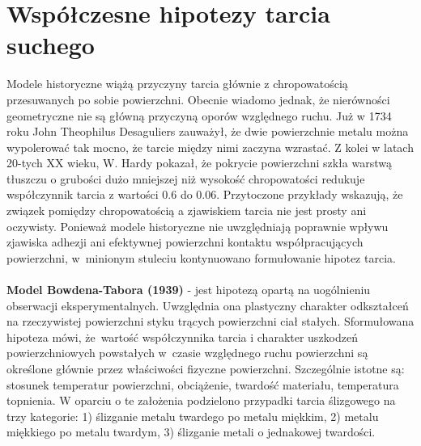 \documentclass[12pt,a4paper,openright]{report} %
\begin{document}
\section{Współczesne hipotezy tarcia suchego}
%
\label{modele_suche_wsp}
Modele historyczne wiążą przyczyny tarcia głównie z chropowatością przesuwanych po sobie powierzchni. Obecnie wiadomo jednak, że nierówności geometryczne nie są główną przyczyną oporów względnego ruchu. Już w 1734 roku John Theophilus Desaguliers zauważył, że dwie powierzchnie metalu można wypolerować tak mocno, że tarcie między nimi zaczyna wzrastać. Z kolei w latach 20-tych XX wieku, W. Hardy pokazał, że pokrycie powierzchni szkła warstwą tłuszczu o grubości dużo mniejszej niż wysokość chropowatości redukuje współczynnik tarcia z wartości 0.6 do 0.06. Przytoczone przykłady wskazują, że związek pomiędzy chropowatością a zjawiskiem tarcia nie jest prosty ani oczywisty. Ponieważ modele historyczne nie uwzględniają poprawnie wpływu zjawiska adhezji ani efektywnej powierzchni kontaktu współpracujących powierzchni, w~minionym stuleciu kontynuowano formułowanie hipotez tarcia.\\
\\
\textbf{Model Bowdena-Tabora (1939)} - jest hipotezą opartą na uogólnieniu obserwacji eksperymentalnych. Uwzględnia ona plastyczny charakter odkształceń na rzeczywistej powierzchni styku trących powierzchni ciał stałych. Sformułowana hipoteza mówi, że~wartość współczynnika tarcia i charakter uszkodzeń powierzchniowych powstałych w~czasie względnego ruchu powierzchni są określone głównie przez właściwości fizyczne powierzchni. Szczególnie istotne są: stosunek temperatur powierzchni, obciążenie, twardość materiału, temperatura topnienia. W oparciu o te założenia podzielono przypadki tarcia ślizgowego na trzy kategorie: 1) ślizganie metalu twardego po metalu miękkim, 2) metalu miękkiego po metalu twardym, 3) ślizganie metali o jednakowej twardości. 
\end{document}
